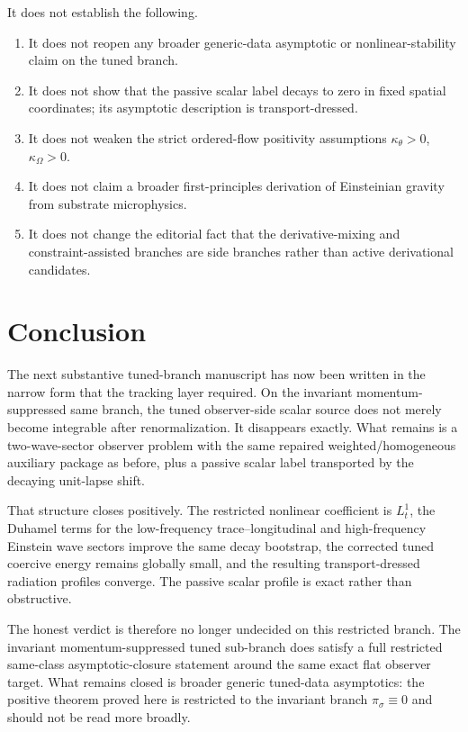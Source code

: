 \documentclass[11pt]{article}
\begin{document}
It does not establish the following.
\begin{enumerate}
    \item It does not reopen any broader generic-data asymptotic or nonlinear-stability claim on the tuned branch.
    \item It does not show that the passive scalar label decays to zero in fixed spatial coordinates; its asymptotic description is transport-dressed.
    \item It does not weaken the strict ordered-flow positivity assumptions \(\kappa_\theta>0\), \(\kappa_\Omega>0\).
    \item It does not claim a broader first-principles derivation of Einsteinian gravity from substrate microphysics.
    \item It does not change the editorial fact that the derivative-mixing and constraint-assisted branches are side branches rather than active derivational candidates.
\end{enumerate}

\section{Conclusion}

The next substantive tuned-branch manuscript has now been written in the narrow form that the tracking layer required. On the invariant momentum-suppressed same branch, the tuned observer-side scalar source does not merely become integrable after renormalization. It disappears exactly. What remains is a two-wave-sector observer problem with the same repaired weighted/homogeneous auxiliary package as before, plus a passive scalar label transported by the decaying unit-lapse shift.

That structure closes positively. The restricted nonlinear coefficient is \(L_t^1\), the Duhamel terms for the low-frequency trace--longitudinal and high-frequency Einstein wave sectors improve the same decay bootstrap, the corrected tuned coercive energy remains globally small, and the resulting transport-dressed radiation profiles converge. The passive scalar profile is exact rather than obstructive.

The honest verdict is therefore no longer undecided on this restricted branch. The invariant momentum-suppressed tuned sub-branch does satisfy a full restricted same-class asymptotic-closure statement around the same exact flat observer target. What remains closed is broader generic tuned-data asymptotics: the positive theorem proved here is restricted to the invariant branch \(\pi_\sigma\equiv 0\) and should not be read more broadly.
\end{document}
